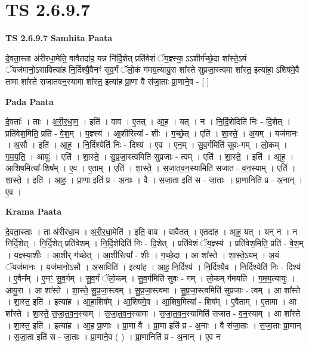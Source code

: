 \documentclass[17pt]{extarticle}
\begin{document}
\section{ TS 2.6.9.7 }

\textbf{TS 2.6.9.7 } \newline
\textbf{Samhita Paata} \newline

दे॒वता॒स्ता अ॑रीरधा॒मेति॒ वावैतदा॑ह॒ यन्न नि॑र्दि॒शेत् प्रति॑वेशं ॅय॒ज्ञ्स्या॒ ऽऽशीर्ग॑च्छे॒दा शा᳚स्ते॒ऽयं ॅयज॑मानो॒ऽसावित्या॑ह नि॒र्दिश्यै॒वैनꣳ॑ सुव॒र्गं ॅलो॒कं ग॑मय॒त्यायु॒रा शा᳚स्ते सुप्रजा॒स्त्वमा शा᳚स्त॒ इत्या॑हा॒ ऽशिष॑मे॒वै तामा शा᳚स्ते सजातवन॒स्यामा शा᳚स्त॒ इत्या॑ह प्रा॒णा वै स॑जा॒ताः प्रा॒णाने॒व - [  ] \newline

\textbf{Pada Paata} \newline

दे॒वताः᳚ । ताः । अ॒री॒र॒धा॒म॒ । इति॑ । वाव । ए॒तत् । आ॒ह॒ । यत् । न । नि॒र्दि॒शेदिति॑ निः - दि॒शेत् । प्रति॑वेश॒मिति॒ प्रति॑ - वे॒श॒म् । य॒ज्ञ्स्य॑ । आ॒शीरित्या᳚ - शीः । ग॒च्छे॒त् । एति॑ । शा॒स्ते॒ । अ॒यम् । यज॑मानः । अ॒सौ । इति॑ । आ॒ह॒ । नि॒र्दिश्येति॑ निः - दिश्य॑ । ए॒व । ए॒न॒म् । सु॒व॒र्गमिति॑ सुवः-गम् । लो॒कम् । ग॒म॒य॒ति॒ । आयुः॑ । एति॑ । शा॒स्ते॒ । सु॒प्र॒जा॒स्त्वमिति॑ सुप्रजाः - त्वम् । एति॑ । शा॒स्ते॒ । इति॑ । आ॒ह॒ । आ॒शिष॒मित्या᳚-शिष᳚म् । ए॒व । ए॒ताम् । एति॑ । शा॒स्ते॒ । स॒जा॒त॒व॒न॒स्यामिति॑ सजात - व॒न॒स्याम् । एति॑ । शा॒स्ते॒ । इति॑ । आ॒ह॒ । प्रा॒णा इति॑ प्र - अ॒नाः । वै । स॒जा॒ता इति॑ स - जा॒ताः । प्रा॒णानिति॑ प्र - अ॒नान् । ए॒व ।  \newline


\textbf{Krama Paata} \newline

दे॒वता॒स्ताः । ता अ॑रीरधा॒म । अ॒री॒र॒धा॒मेति॑ । इति॒ वाव । वावैतत् । ए॒तदा॑ह । आ॒ह॒ यत् । यन् न । न नि॑र्दि॒शेत् । नि॒र्दि॒शेत् प्रति॑वेशम् । नि॒र्दि॒शेदिति॑ निः - दि॒शेत् । प्रति॑वेशं ॅय॒ज्ञ्स्य॑ । प्रति॑वेश॒मिति॒ प्रति॑ - वे॒श॒म् । य॒ज्ञ्स्या॒शीः । आ॒शीर् ग॑च्छेत् । आ॒शीरित्या᳚ - शीः । ग॒च्छे॒दा । आ शा᳚स्ते । शा॒स्ते॒ऽयम् । अ॒यं ॅयज॑मानः । यज॑मानो॒ऽसौ । अ॒साविति॑ । इत्या॑ह । आ॒ह॒ नि॒र्दिश्य॑ । नि॒र्दिश्यै॒व । नि॒र्दिश्येति॑ निः - दिश्य॑ । ए॒वैन᳚म् । ए॒नꣳ॒॒ सु॒व॒र्गम् । सु॒व॒र्गं ॅलो॒कम् । सु॒व॒र्गमिति॑ सुवः - गम् । लो॒कम् ग॑मयति । ग॒म॒य॒त्यायुः॑ । आयु॒रा । आ शा᳚स्ते । शा॒स्ते॒ सु॒प्र॒जा॒स्त्वम् । सु॒प्र॒जा॒स्त्वमा । सु॒प्र॒जा॒स्त्वमिति॑ सुप्रजाः - त्वम् । आ शा᳚स्ते । शा॒स्त॒ इति॑ । इत्या॑ह । आ॒हा॒शिष᳚म् । आ॒शिष॑मे॒व । आ॒शिष॒मित्या᳚ - शिष᳚म् । ए॒वैताम् । ए॒तामा । आ शा᳚स्ते । शा॒स्ते॒ स॒जा॒त॒व॒न॒स्याम् । स॒जा॒त॒व॒न॒स्यामा । स॒जा॒त॒व॒न॒स्यामिति॑ सजात - व॒न॒स्याम् । आ शा᳚स्ते । शा॒स्त॒ इति॑ । इत्या॑ह । आ॒ह॒ प्रा॒णाः । प्रा॒णा वै । प्रा॒णा इति॑ प्र - अ॒नाः । वै स॑जा॒ताः । स॒जा॒ताः प्रा॒णान् । स॒जा॒ता इति॑ स - जा॒ताः । प्रा॒णाने॒व ( ) । प्रा॒णानिति॑ प्र - अ॒नान् । ए॒व न \newline
\end{document}
